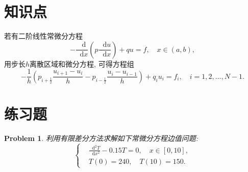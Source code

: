 \documentclass[a4paper, 12pt]{ctexart}
\title{\TITLE}
\author{\AUTHOR}
\date{\today}
\theoremstyle{plain}
\newtheorem{problem}{Problem}[section]
\theoremstyle{plain}
\theoremstyle{plain}
\theoremstyle{nonumberplain}
\newcommand*{\diff}{\mathop{}\!\mathrm{d}}
\begin{document}

    \maketitle
    \thispagestyle{empty}



    \newpage
    \tableofcontents


    \newpage
    \pagestyle{fancy}
    \linenumbers

    \section{知识点}

    若有二阶线性常微分方程
    \begin{equation}
        -\frac{\diff}{\diff x}\left(p\frac{\diff u}{\diff x}\right)+qu=f,\quad x\in(a,b),
    \end{equation}
    用步长$h$离散区域和微分方程, 可得方程组
    \begin{equation}
        -\frac{1}{h}\left(p_{i+\frac{1}{2}}\frac{u_{i+1}-u_{i}}{h}-p_{i-\frac{1}{2}}\frac{u_{i}-u_{i-1}}{h}\right)+q_{i}u_{i}=f_{i},\quad i=1,2,\dotsc,N-1.
    \end{equation}

    \section{练习题}

    \begin{problem}
        \label{problem: 1}
        利用有限差分方法求解如下常微分方程边值问题:
        \begin{equation}
            \left\{
            \begin{aligned}
                &\frac{\diff^{2}T}{\diff x^{2}}-0.15T=0,\quad x\in [0, 10],\\
                &T(0)=240,\quad T(10)=150.
            \end{aligned}
            \right.
        \end{equation}
    \end{problem}
\end{document}
